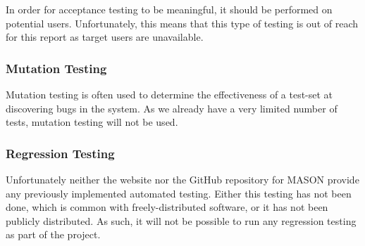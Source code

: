 \documentclass[11pt]{article}
\begin{document}
In order for acceptance testing to be meaningful, it should be performed on potential users.
Unfortunately, this means that this type of testing is out of reach for this report as target users are unavailable.

\subsubsection{Mutation Testing}
Mutation testing is often used to determine the effectiveness of a test-set at discovering bugs in the system.
As we already have a very limited number of tests, mutation testing will not be used.

\subsubsection{Regression Testing}
Unfortunately neither the website nor the GitHub repository for MASON provide any previously implemented automated testing.
Either this testing has not been done, which is common with freely-distributed software, or it has not been publicly distributed.
As such, it will not be possible to run any regression testing as part of the project.

\newpage
\end{document}
